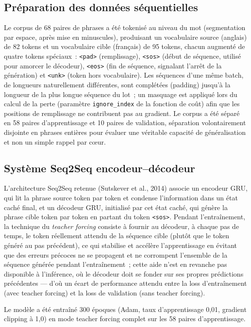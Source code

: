 \documentclass[11pt,a4paper]{article}
\begin{document}
\subsection{Préparation des données séquentielles}

Le corpus de 68 paires de phrases a été tokenisé au niveau du mot (segmentation par espace, après mise en minuscules), produisant un vocabulaire source (anglais) de 82 tokens et un vocabulaire cible (français) de 95 tokens, chacun augmenté de quatre tokens spéciaux~: \texttt{<pad>} (remplissage), \texttt{<sos>} (début de séquence, utilisé pour amorcer le décodeur), \texttt{<eos>} (fin de séquence, signalant l'arrêt de la génération) et \texttt{<unk>} (token hors vocabulaire). Les séquences d'une même batch, de longueurs naturellement différentes, sont complétées (padding) jusqu'à la longueur de la plus longue séquence du lot~; un masquage est appliqué lors du calcul de la perte (paramètre \texttt{ignore\_index} de la fonction de coût) afin que les positions de remplissage ne contribuent pas au gradient. Le corpus a été séparé en 58 paires d'apprentissage et 10 paires de validation, séparation volontairement disjointe en phrases entières pour évaluer une véritable capacité de généralisation et non un simple rappel par cœur.

\subsection{Système Seq2Seq encodeur--décodeur}

L'architecture Seq2Seq retenue (Sutskever et al., 2014) associe un encodeur GRU, qui lit la phrase source token par token et condense l'information dans un état caché final, et un décodeur GRU, initialisé par cet état caché, qui génère la phrase cible token par token en partant du token \texttt{<sos>}. Pendant l'entraînement, la technique du \emph{teacher forcing} consiste à fournir au décodeur, à chaque pas de temps, le token réellement attendu de la séquence cible (plutôt que le token généré au pas précédent), ce qui stabilise et accélère l'apprentissage en évitant que des erreurs précoces ne se propagent et ne corrompent l'ensemble de la séquence générée pendant l'entraînement~; cette aide n'est en revanche pas disponible à l'inférence, où le décodeur doit se fonder sur ses propres prédictions précédentes --- d'où un écart de performance attendu entre la loss d'entraînement (avec teacher forcing) et la loss de validation (sans teacher forcing).

Le modèle a été entraîné 300 époques (Adam, taux d'apprentissage 0,01, gradient clipping à 1,0) en mode teacher forcing complet sur les 58 paires d'apprentissage.
\end{document}
